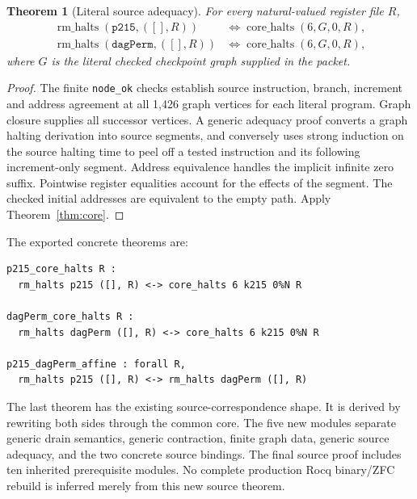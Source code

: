 \documentclass[11pt,letterpaper]{article}
\newtheorem{theorem}{Theorem}[section]
\theoremstyle{definition}\newtheorem{definition}[theorem]{Definition}
\begin{document}
\begin{theorem}[Literal source adequacy]\label{thm:source}
For every natural-valued register file $R$,
\begin{align*}
 \operatorname{rm\_halts}(\texttt{p215},([],R))
 &\Longleftrightarrow \operatorname{core\_halts}(6,G,0,R),\\
 \operatorname{rm\_halts}(\texttt{dagPerm},([],R))
 &\Longleftrightarrow \operatorname{core\_halts}(6,G,0,R),
\end{align*}
where $G$ is the literal checked checkpoint graph supplied in the packet.
\end{theorem}

\begin{proof}
The finite \texttt{node\_ok} checks establish source instruction, branch,
increment and address agreement at all 1,426 graph vertices for each literal
program. Graph closure supplies all successor vertices. A generic adequacy
proof converts a graph halting derivation into source segments, and conversely
uses strong induction on the source halting time to peel off a tested
instruction and its following increment-only segment. Address equivalence
handles the implicit infinite zero suffix. Pointwise register equalities account
for the effects of the segment. The checked initial addresses are equivalent
to the empty path. Apply Theorem~\ref{thm:core}.
\end{proof}

\begin{samepage}
The exported concrete theorems are:
\begin{lstlisting}
p215_core_halts R :
  rm_halts p215 ([], R) <-> core_halts 6 k215 0%N R

dagPerm_core_halts R :
  rm_halts dagPerm ([], R) <-> core_halts 6 k215 0%N R

p215_dagPerm_affine : forall R,
  rm_halts p215 ([], R) <-> rm_halts dagPerm ([], R)
\end{lstlisting}
\end{samepage}
The last theorem has the existing source-correspondence shape. It is derived
by rewriting both sides through the common core. The five new modules separate
generic drain semantics, generic contraction, finite graph data, generic source
adequacy, and the two concrete source bindings. The final source proof includes
ten inherited prerequisite modules. No complete production Rocq binary/ZFC
rebuild is inferred merely from this new source theorem.
\end{document}
